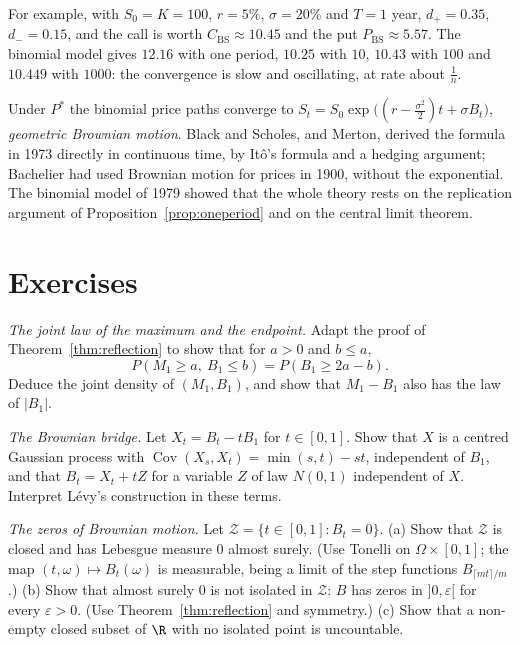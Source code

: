 For example, with $S_0=K=100$, $r=5\%$, $\sigma=20\%$ and $T=1$ year, $d_+=0.35$, $d_-=0.15$, and the call is worth $C_{\mathrm{BS}}\approx10.45$ and the put
$P_{\mathrm{BS}}\approx5.57$. The binomial model gives $12.16$ with one period, $10.25$ with $10$, $10.43$ with $100$ and $10.449$ with $1000$: the
convergence is slow and oscillating, at rate about $\frac1n$.

\begin{remark}
Under $P^*$ the binomial price paths converge to $S_t=S_0\exp\bigl((r-\frac{\sigma^2}2)t+\sigma B_t\bigr)$, \emph{geometric Brownian motion}. Black and Scholes, and
Merton, derived the formula in 1973 directly in continuous time, by It\^o's formula and a hedging argument; Bachelier
had used Brownian motion for prices in 1900, without the exponential. The binomial model of 1979 showed that the whole
theory rests on the replication argument of Proposition~\ref{prop:oneperiod} and on the central limit theorem.
\end{remark}

\section{Exercises}

\begin{exercise}[$\star\star$]\label{ex:maxjoint}
\emph{The joint law of the maximum and the endpoint.} Adapt the proof of Theorem~\ref{thm:reflection} to show that for $a>0$ and $b\le a$,
\[
P(M_1\ge a,\ B_1\le b)=P(B_1\ge2a-b).
\]
Deduce the joint density of $(M_1,B_1)$, and show that $M_1-B_1$ also has the law of $|B_1|$.
\end{exercise}

\begin{exercise}[$\star$]\label{ex:bridge}
\emph{The Brownian bridge.} Let $X_t=B_t-tB_1$ for $t\in[0,1]$. Show that $X$ is a centred Gaussian process with $\operatorname{Cov}(X_s,X_t)=\min(s,t)-st$, independent of $B_1$, and
that $B_t=X_t+tZ$ for a variable $Z$ of law $N(0,1)$ independent of $X$. Interpret L\'evy's construction in these terms.
\end{exercise}

\begin{exercise}[$\star\star$]\label{ex:zeros}
\emph{The zeros of Brownian motion.} Let $\mathcal Z=\{t\in[0,1]:B_t=0\}$.
(a) Show that $\mathcal Z$ is closed and has Lebesgue measure $0$ almost surely. (Use Tonelli on $\Omega\times[0,1]$; the map $(t,\omega)\mapsto B_t(\omega)$ is
measurable, being a limit of the step functions $B_{\lceil mt\rceil/m}$.)
(b) Show that almost surely $0$ is not isolated in $\mathcal Z$: $B$ has zeros in $]0,\varepsilon[$ for every $\varepsilon>0$. (Use Theorem~\ref{thm:reflection} and symmetry.)
(c) Show that a non-empty closed subset of $\R$ with no isolated point is uncountable.
\end{exercise}

